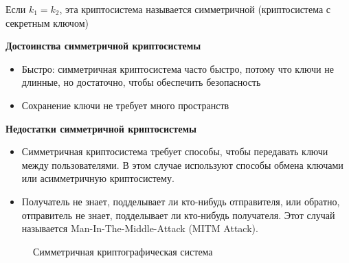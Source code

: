 Если $k_1 = k_2$, эта криптосистема называется симметричной (криптосистема с секретным ключом)

\textbf{Достоинства симметричной криптосистемы}
\begin{itemize}[label={--},noitemsep,nolistsep]
	\item Быстро: симметричная криптосистема часто быстро, потому что ключи не длинные, но достаточно, чтобы  обеспечить безопасность
	\item Сохранение ключи не требует много пространств
\end{itemize}

\textbf{Недостатки симметричной криптосистемы}
\begin{itemize}[label={--},noitemsep,nolistsep]
	\item Симметричная криптосистема требует способы, чтобы передавать ключи между пользователями. В этом случае используют способы обмена ключами или асимметричную криптосистему.
	\item Получатель не знает, подделывает ли кто-нибудь отправителя, или обратно, отправитель не знает, подделывает ли кто-нибудь получателя. Этот случай называется Man-In-The-Middle-Attack (MITM Attack).
\end{itemize}

\begin{figure}[ht]
	\centering
	
	
	\caption{Симметричная криптографическая система}

\end{figure}

